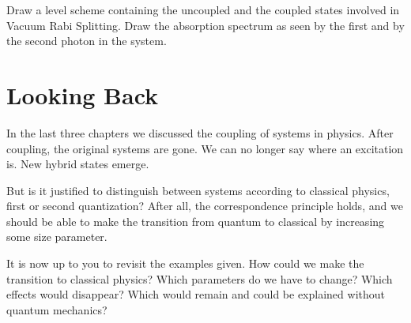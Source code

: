 \begin{questions}
\item Draw a level scheme containing the uncoupled and the coupled states involved in Vacuum Rabi Splitting. Draw the absorption spectrum as seen by the first and by the second photon in the system.
\end{questions}


\section{Looking Back}

In the last three chapters we discussed the coupling of systems in physics. After coupling, the original systems are gone. We can no longer say where an excitation is. New hybrid states emerge.

But is it justified to distinguish between systems according to classical physics, first or second quantization? After all, the correspondence principle holds, and we should be able to make the transition from quantum to classical by increasing some size parameter.

\begin{questions}
\item It is now up to you to revisit the examples given. How could we make the transition to classical physics? Which parameters do we have to change? Which effects would disappear? Which would remain and could be explained without quantum mechanics?
  \end{questions}
  
\printbibliography[segment=\therefsegment,heading=subbibliography]
